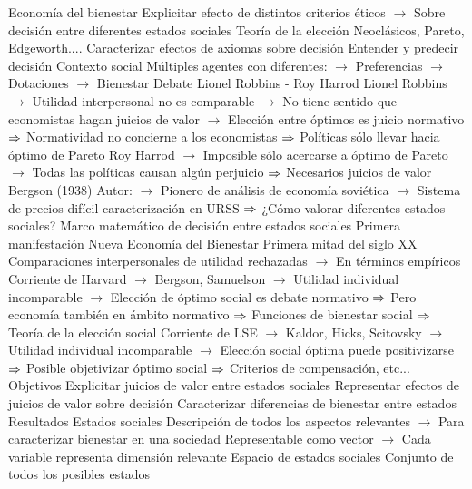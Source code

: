 \documentclass{nuevotema}
\begin{document}
\begin{esquemal}
				\4 Economía del bienestar
				\4[] Explicitar efecto de distintos criterios éticos
				\4[] $\to$ Sobre decisión entre diferentes estados sociales
				\4 Teoría de la elección
				\4[] Neoclásicos, Pareto, Edgeworth....
				\4[] Caracterizar efectos de axiomas sobre decisión
				\4[] Entender y predecir decisión
				\4 Contexto social
				\4[] Múltiples agentes con diferentes:
				\4[] $\to$ Preferencias
				\4[] $\to$ Dotaciones
				\4[] $\to$ Bienestar
				\4 Debate Lionel Robbins -  Roy Harrod
				\4[] Lionel Robbins
				\4[] $\to$ Utilidad interpersonal no es comparable
				\4[] $\to$ No tiene sentido que economistas hagan juicios de valor
				\4[] $\to$ Elección entre óptimos es juicio normativo
				\4[] $\Rightarrow$ Normatividad no concierne a los economistas
				\4[] $\Rightarrow$ Políticas sólo llevar hacia óptimo de Pareto
				\4[] Roy Harrod
				\4[] $\to$ Imposible sólo acercarse a óptimo de Pareto
				\4[] $\to$ Todas las políticas causan algún perjuicio
				\4[] $\Rightarrow$ Necesarios juicios de valor
				\4 Bergson (1938)
				\4[] Autor:
				\4[] $\to$ Pionero de análisis de economía soviética
				\4[] $\to$ Sistema de precios difícil caracterización en URSS
				\4[] $\Rightarrow$ ¿Cómo valorar diferentes estados sociales?
				\4[] Marco matemático de decisión entre estados sociales
				\4[] Primera manifestación
				\4 Nueva Economía del Bienestar
				\4[] Primera mitad del siglo XX
				\4[] Comparaciones interpersonales de utilidad rechazadas
				\4[] $\to$ En términos empíricos
				\4[] Corriente de Harvard
				\4[] $\to$ Bergson, Samuelson
				\4[] $\to$ Utilidad individual incomparable
				\4[] $\to$ Elección de óptimo social es debate normativo
				\4[] $\Rightarrow$ Pero economía también en ámbito normativo
				\4[] $\Rightarrow$ Funciones de bienestar social
				\4[] $\Rightarrow$ Teoría de la elección social
				\4[] Corriente de LSE
				\4[] $\to$ Kaldor, Hicks, Scitovsky
				\4[] $\to$ Utilidad individual incomparable
				\4[] $\to$ Elección social óptima puede positivizarse
				\4[] $\Rightarrow$ Posible objetivizar óptimo social
				\4[] $\Rightarrow$ Criterios de compensación, etc...
			\3 Objetivos
				\4 Explicitar juicios de valor entre estados sociales
				\4 Representar efectos de juicios de valor sobre decisión
				\4 Caracterizar diferencias de bienestar entre estados
			\3 Resultados
				\4 Estados sociales
				\4[] Descripción de todos los aspectos relevantes
				\4[] $\to$ Para caracterizar bienestar en una sociedad
				\4[] Representable como vector
				\4[] $\to$ Cada variable representa dimensión relevante
				\4 Espacio de estados sociales
				\4[] Conjunto de todos los posibles estados

\end{esquemal}
\end{document}
